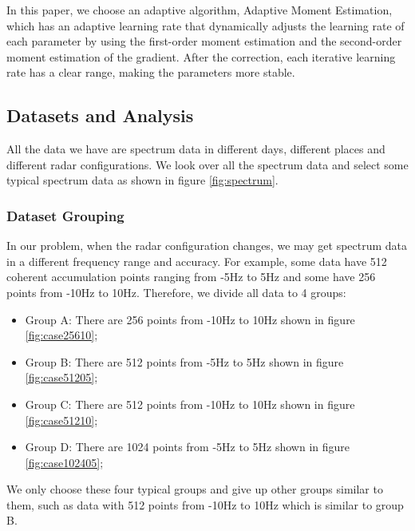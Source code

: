 In this paper, we choose an adaptive algorithm, Adaptive Moment Estimation, which has an adaptive learning rate that dynamically adjusts the learning rate of each parameter by using the first-order moment estimation and the second-order moment estimation of the gradient. After the correction, each iterative learning rate has a clear range, making the parameters more stable.

\subsection{Datasets and Analysis}

All the data we have are spectrum data in different days, different places and different radar configurations. We look over all the spectrum data and select some typical spectrum data as shown in figure \ref{fig:spectrum}.

\subsubsection{Dataset Grouping}
In our problem, when the radar configuration changes, we may get spectrum data in a different frequency range and accuracy. For example, some data have 512 coherent accumulation points ranging from -5Hz to 5Hz and some have 256 points from -10Hz to 10Hz. Therefore, we divide all data to 4 groups:
\begin{itemize}
	\item Group A: There are 256 points from -10Hz to 10Hz shown in figure \ref{fig:case25610};
	\item Group B: There are 512 points from -5Hz to 5Hz shown in figure \ref{fig:case51205};
	\item Group C: There are 512 points from -10Hz to 10Hz shown in figure \ref{fig:case51210};
	\item Group D: There are 1024 points from -5Hz to 5Hz shown in figure \ref{fig:case102405};
\end{itemize}
We only choose these four typical groups and give up other groups similar to them, such as data with 512 points from -10Hz to 10Hz which is similar to group B.

